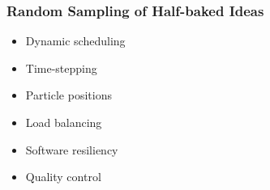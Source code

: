 \begin{frame}[fragile] \frametitle{Random Sampling of Half-baked Ideas}
      \begin{itemize}
        \item Dynamic scheduling
        \item Time-stepping
        \item Particle positions
        \item Load balancing
        \item Software resiliency
        \item Quality control
      \end{itemize}
\end{frame}

